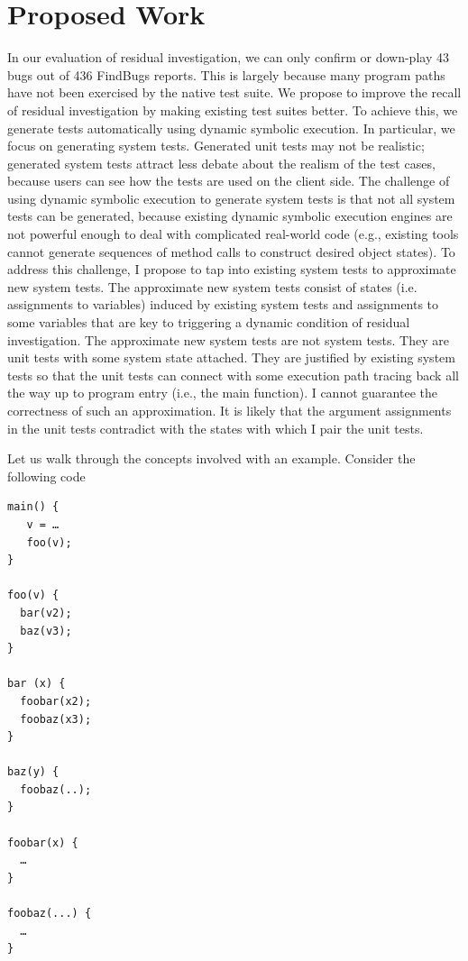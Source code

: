\documentclass[proposal]{umthesis} %
\begin{document}
  
\chapter{Proposed Work}
\label{chp:proposed}

In our evaluation of residual investigation, we can only confirm or down-play 43 bugs out of 436 FindBugs reports. This is largely because many program paths have not been exercised by the native test suite. We propose to improve the recall of residual investigation by making existing test suites better. To achieve this, we generate tests automatically using dynamic symbolic execution.  In particular, we focus on generating system tests. Generated unit tests may not be realistic; generated system tests attract less debate about the realism of the test cases, because users can see how the tests are used on the client side.  The challenge of using dynamic symbolic execution to generate system tests is that not all system tests can be generated, because existing dynamic symbolic execution engines are not powerful enough to deal with complicated real-world code (e.g., existing tools cannot generate sequences of method calls to construct desired object states)\cite{Xiao:2011:PIP:1985793.1985876}.  To address this challenge, I propose to tap into existing system tests to approximate new system tests. The approximate new system tests consist of  states (i.e. assignments to variables) induced by existing system tests and assignments to some variables that are key to triggering a dynamic condition of residual investigation.  The approximate new system tests are not system tests.  They are unit tests with some system state attached.  They are justified by existing system tests so that the unit tests can connect with some execution path tracing back all the way up to program entry (i.e., the main function).  I cannot guarantee the correctness of such an approximation. It is likely that the argument assignments in the unit tests contradict with the states with which I pair the unit tests.  

Let us walk through the concepts involved with an example. Consider the following code
\begin{small}
\begin{verbatim}
main() {
   v = …
   foo(v);
}

foo(v) {
  bar(v2);
  baz(v3);
}

bar (x) {
  foobar(x2);
  foobaz(x3);
}

baz(y) {
  foobaz(..);
}

foobar(x) {
  …
}

foobaz(...) {
  …
}
\end{verbatim}
\end{small}
\end{document}
